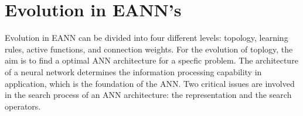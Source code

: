 






\section{Evolution in EANN's}

Evolution in EANN can be divided into four different levels: topology, learning
rules, active functions, and connection weights. For the evolution of toplogy,
the aim is to find a optimal ANN architecture for a specfic problem. The
architecture of a neural network determines the information processing
capability in application, which is the foundation of the ANN. Two critical
issues are involved in the search process of an ANN architecture: the
representation and the search operators.










